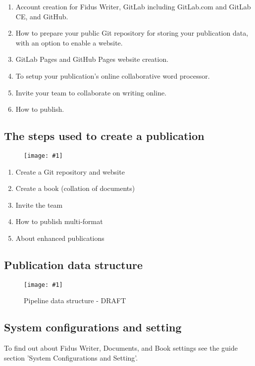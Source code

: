 \documentclass{article}
\newlength{\imgwidth}
\newcommand\scaledgraphics[2]{%
                
\settowidth{\imgwidth}{\texttt{[image: \#1]}}%
                
\setlength{\imgwidth}{\minof{\imgwidth}{#2\textwidth}}%
                
\texttt{[image: \#1]}%
                
}
\begin{document}
\begin{enumerate}
\item Account creation for Fidus Writer, GitLab including GitLab.com and GitLab CE, and GitHub.


\item How to prepare your public Git repository for storing your publication data, with an option to enable a website.


\item GitLab Pages and GitHub Pages website creation.


\item To setup your publication's online collaborative word processor.


\item Invite your team to collaborate on writing online.


\item How to publish.


\end{enumerate}

\subsection{The steps used to create a publication}\label{H3159430}


\begin{figure}
\scaledgraphics{fec439eb-c4d6-4587-a4a2-affde7c45586.png}{0.5}
\label{F18710661}
\end{figure}

\begin{enumerate}
\item Create a Git repository and website


\item Create a book (collation of documents)


\item Invite the team


\item How to publish multi-format


\item About enhanced publications


\end{enumerate}

\subsection{Publication data structure}\label{H4820656}


\begin{figure}
\scaledgraphics{5acd448a-c9c8-4584-aed8-e85eeeee2279.png}{1}
\caption*{Pipeline data structure - DRAFT}\label{F30664801}
\end{figure}


\subsection{System configurations and setting}\label{H4870876}



To find out about Fidus Writer, Documents, and Book settings see the guide section 'System Configurations and Setting'.
\end{document}
